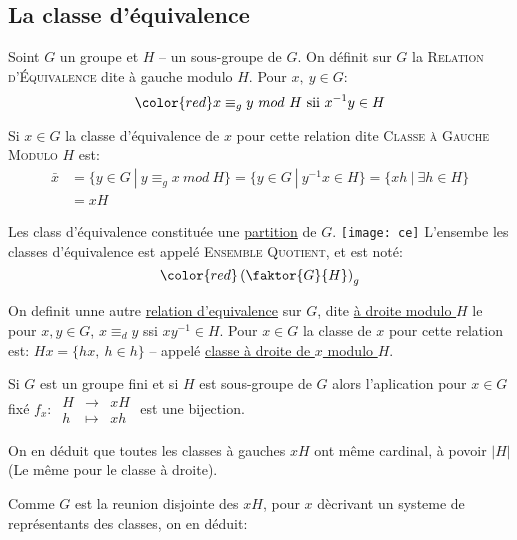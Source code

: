 \subsection{La classe d'équivalence} %
\label{sub:la_classe_d_equivalance}


\begin{definition}
	Soint $G$ un groupe et $H$ -- un sous-groupe de $G$. On définit sur $G$ la \textsc{Relation d'Équivalence} dite à gauche modulo $H$. Pour $x,\ y\in G$: 
	\[ \color{red} x\equiv_g y\ mod\ H \mbox{ sii } x^{-1}y\in H \]
	\vspace{-8mm}
\end{definition}

Si $x\in G$ la classe d'équivalence de $x$ pour cette relation dite \textsc{Classe à Gauche Modulo $H$} est:
\begin{align*}	
\bar{x} & =\{y\in G\ |\ y\equiv_g x\  mod\ H\}=\{y\in G\ |\ y^{-1}x\in H\}=\{xh\ |\ \exists h\in H\}\\
 & =xH
\end{align*} 

\begin{remark}
	Les class d'équivalence constituée une \underline{partition} de $G$.
	\texttt{[image: ce]}
	L'ensembe les classes d'équivalence est appelé \textsc{Ensemble Quotient}, et est noté:
	$$ \color{red}\left(	\faktor{G}{H}	\right)_g$$
\end{remark}

On definit unne autre \underline{relation d'equivalence} sur $G$, dite \underline{à droite modulo $H$} le pour $x, y\in G$, $x\equiv_dy$ ssi $xy^{-1}\in H$. Pour $x\in G$ la classe de $x$ pour cette relation est: $Hx=\{hx,\ h\in h\}$ -- appelé \underline{classe à droite de $x$ modulo $H$}.

Si $G$ est un groupe fini et si $H$ est sous-groupe de $G$ alors l'aplication pour $x\in G$ fixé $f_x:\ \begin{array}{rcl}H &\rightarrow & xH\\ h &\mapsto & xh\end{array}$ est une bijection.

On en déduit que toutes les classes à gauches $xH$ ont même cardinal, à povoir $|H|$ (Le même pour le classe à droite).

Comme $G$ est la reunion disjointe des $xH$, pour $x$ dècrivant un systeme de représentants des classes, on en déduit:


